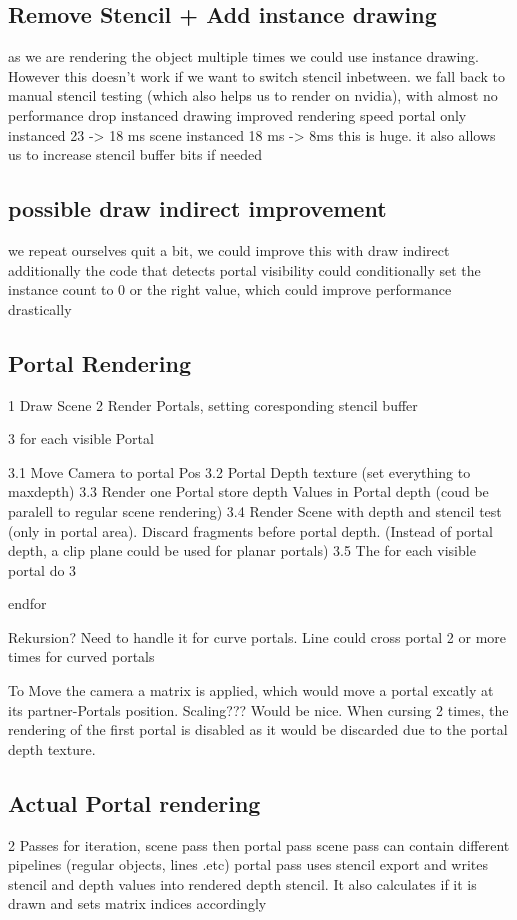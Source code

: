 \subsection{Remove Stencil + Add instance drawing}
as we are rendering the object multiple times we could use instance drawing. However this doesn't work if we want to switch stencil inbetween.
we fall back to manual stencil testing (which also helps us to render on nvidia), with almost no performance drop
instanced drawing improved rendering speed portal only instanced 23 -> 18 ms
scene instanced 18 ms -> 8ms
this is huge.
it also allows us to increase stencil buffer bits if needed

\subsection{possible draw indirect improvement}
we repeat ourselves quit a bit, we could improve this with draw indirect
additionally the code that detects portal visibility could conditionally set the instance count to 0 or the right value, which could improve performance drastically

\subsection{Portal Rendering}
1 Draw Scene
2 Render Portals, setting coresponding stencil buffer

3 for each visible Portal

3.1 Move Camera to portal Pos
3.2 Portal Depth texture (set everything to maxdepth)
3.3 Render one Portal store depth Values in Portal depth (coud be paralell to regular scene rendering)
3.4 Render Scene with depth and stencil test (only in portal area). Discard fragments before portal depth.
(Instead of portal depth, a clip plane could be used for planar portals)
3.5 The for each visible portal do 3

endfor

Rekursion? Need to handle it for curve portals. Line could cross portal 2 or more times for curved portals


To Move the camera a matrix is applied, which would move a portal excatly at its partner-Portals position. Scaling??? Would be nice.
When cursing 2 times, the rendering of the first portal is disabled as it would be discarded due to the portal depth texture.

\subsection{Actual Portal rendering}
2 Passes for iteration, scene pass then portal pass
scene pass can contain different pipelines (regular objects, lines .etc)
portal pass uses stencil export and writes stencil and depth values into rendered depth stencil. It also calculates if it is drawn and sets matrix indices accordingly

